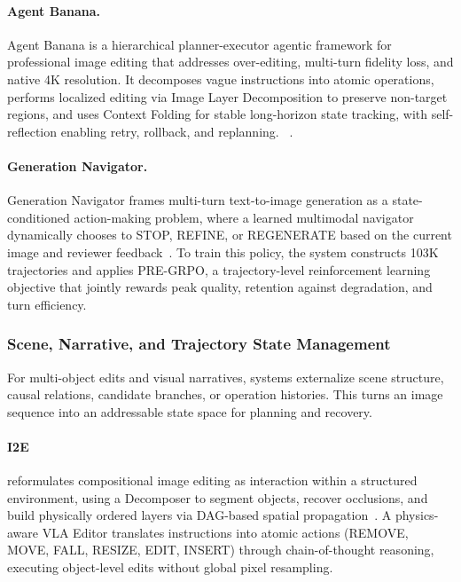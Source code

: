 \paragraph{Agent Banana.}
Agent Banana is a hierarchical planner-executor agentic framework for professional image editing that addresses over-editing, multi-turn fidelity loss, and native 4K resolution. It decomposes vague instructions into atomic operations, performs localized editing via Image Layer Decomposition to preserve non-target regions, and uses Context Folding for stable long-horizon state tracking, with self-reflection enabling retry, rollback, and replanning. ~\cite{ye2026agentbanana}. 

\paragraph{Generation Navigator.}
Generation Navigator frames multi-turn text-to-image generation as a state-conditioned action-making problem, where a learned multimodal navigator dynamically chooses to STOP, REFINE, or REGENERATE based on the current image and reviewer feedback~\cite{avg260517969}. To train this policy, the system constructs 103K trajectories and applies PRE-GRPO, a trajectory-level reinforcement learning objective that jointly rewards peak quality, retention against degradation, and turn efficiency. 

\subsubsection{Scene, Narrative, and Trajectory State Management}
For multi-object edits and visual narratives, systems externalize scene structure, causal relations, candidate branches, or operation histories. This turns an image sequence into an addressable state space for planning and recovery.

\paragraph{I2E}
 reformulates compositional image editing as interaction within a structured environment, using a Decomposer to segment objects, recover occlusions, and build physically ordered layers via DAG-based spatial propagation~\cite{avg260103741}. A physics-aware VLA Editor translates instructions into atomic actions (REMOVE, MOVE, FALL, RESIZE, EDIT, INSERT) through chain-of-thought reasoning, executing object-level edits without global pixel resampling.

